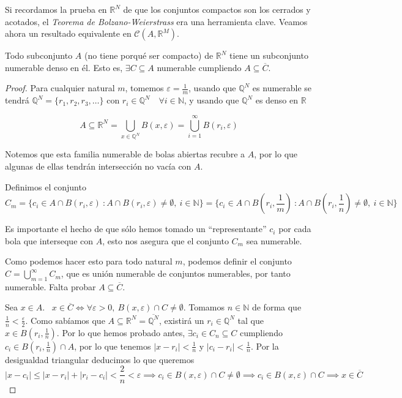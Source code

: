 Si recordamos la prueba en $\mathbb{R}^N$ de que los conjuntos compactos son los cerrados y acotados, el \textit{Teorema de Bolzano-Weierstrass} era una herramienta clave. Veamos ahora un resultado equivalente en $\mathcal{C}(A,\mathbb{R}^M)$.

\begin{lema}
  Todo subconjunto $A$ (no tiene porqué ser compacto) de
  $\mathbb{R}^N$ tiene un subconjunto numerable denso en \'el. Esto
  es, $\exists C \subseteq A$ numerable cumpliendo
  $A \subseteq \overline{C}$.
\end{lema}

\begin{proof}
  Para cualquier natural $m$, tomemos $\varepsilon = \frac{1}{m}$,
  usando que $\mathbb{Q}^N$ es numerable se tendr\'a
  $\mathbb{Q}^N = \{r_1, r_2, r_3, \ldots\}$ con
  $r_i \in \mathbb{Q}^N \quad \forall i \in \mathbb{N}$, y usando
  que $\mathbb{Q}^N$ es denso en $\mathbb{R}$
 
  \[A \subseteq \mathbb{R}^N = \bigcup\limits_{x \in \mathbb{Q}^N}B(x,
    \varepsilon) = \bigcup\limits_{i=1}^\infty B(r_i, \varepsilon)\]

  Notemos que esta familia numerable de bolas abiertas recubre a $A$,
  por lo que algunas de ellas tendrán intersección no vacía con $A$.
  
  Definimos el conjunto
  \[C_m = \{c_i \in A \cap B(r_i,\varepsilon) \ : A \cap
    B(r_i,\varepsilon) \neq \emptyset, \ i \in \mathbb{N}\} = \{c_i
    \in A \cap B(r_i, {\scriptstyle\frac{1}{m}}) \ : A \cap
    B(r_i,{\scriptstyle\frac{1}{n}}) \neq \emptyset, \ i \in
    \mathbb{N}\}\]

  Es importante el hecho de que s\'olo hemos tomado un
  ``representante'' $c_i$ por cada bola que interseque con $A$, esto
  nos asegura que el conjunto $C_m$ sea numerable.

  Como podemos hacer esto para todo natural $m$, podemos definir el
conjunto \(C = \bigcup\limits_{m=1}^\infty C_m\), que es unión
numerable de conjuntos numerables, por tanto numerable. Falta
probar $A \subseteq \overline{C}$.

Sea $x \in A$.~
$x \in \overline{C} \iff \forall \varepsilon > 0, \ B(x, \varepsilon)
\cap C \neq \emptyset$. Tomamos $n \in \mathbb{N}$ de forma que
$\frac{1}{n} < \frac{\varepsilon}{2}$. Como sabíamos que
$A \subseteq \mathbb{R}^N = \overline{\mathbb{Q}^N}$, existir\'a un
$r_i \in \mathbb{Q}^N$ tal que $x \in B(r_i, \frac{1}{n})$. Por lo que
hemos probado antes, $\exists c_i \in C_n \subseteq C$ cumpliendo
$c_i \in B(r_i, \frac{1}{n}) \cap A$, por lo que tenemos
$|x-r_i| < \frac{1}{n}$ y $|c_i-r_i| < \frac{1}{n}$. Por la
desigualdad triangular deducimos lo que queremos
\[|x - c_i| \leq |x-r_i| + |r_i-c_i| < \frac{2}{n} < \varepsilon
  \implies c_i \in B(x, \varepsilon) \cap C \neq \emptyset \implies
  c_i \in B(x, \varepsilon) \cap C \implies x \in \overline{C}\]

\end{proof}

